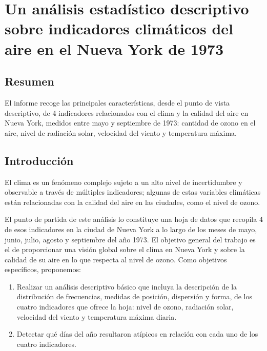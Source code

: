 \documentclass[
]{article}
\providecommand{\tightlist}{%
  \setlength{\itemsep}{0pt}\setlength{\parskip}{0pt}}
\begin{document}
\hypertarget{un-anuxe1lisis-estaduxedstico-descriptivo-sobre-indicadores-climuxe1ticos-del-aire-en-el-nueva-york-de-1973}{%
\section{Un análisis estadístico descriptivo sobre indicadores
climáticos del aire en el Nueva York de
1973}\label{un-anuxe1lisis-estaduxedstico-descriptivo-sobre-indicadores-climuxe1ticos-del-aire-en-el-nueva-york-de-1973}}

\hypertarget{resumen}{%
\subsection{Resumen}\label{resumen}}

El informe recoge las principales características, desde el punto de
vista descriptivo, de 4 indicadores relacionados con el clima y la
calidad del aire en Nueva York, medidos entre mayo y septiembre de 1973:
cantidad de ozono en el aire, nivel de radiación solar, velocidad del
viento y temperatura máxima.

\hypertarget{introducciuxf3n}{%
\subsection{Introducción}\label{introducciuxf3n}}

El clima es un fenómeno complejo sujeto a un alto nivel de incertidumbre
y observable a través de múltiples indicadores; algunas de estas
variables climáticas están relacionadas con la calidad del aire en las
ciudades, como el nivel de ozono.

El punto de partida de este análisis lo constituye una hoja de datos que
recopila 4 de esos indicadores en la ciudad de Nueva York a lo largo de
los meses de mayo, junio, julio, agosto y septiembre del año 1973. El
objetivo general del trabajo es el de proporcionar una visión global
sobre el clima en Nueva York y sobre la calidad de su aire en lo que
respecta al nivel de ozono. Como objetivos específicos, proponemos:

\begin{enumerate}
\def\labelenumi{\arabic{enumi}.}
\tightlist
\item
  Realizar un análisis descriptivo básico que incluya la descripción de
  la distribución de frecuencias, medidas de posición, dispersión y
  forma, de los cuatro indicadores que ofrece la hoja: nivel de ozono,
  radiación solar, velocidad del viento y temperatura máxima diaria.
\item
  Detectar qué días del año resultaron atípicos en relación con cada uno
  de los cuatro indicadores.
\end{enumerate}
\end{document}
